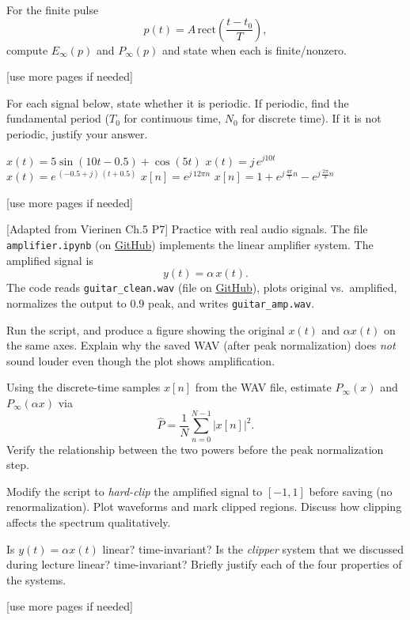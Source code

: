 \documentclass{ee102_pset}
\begin{document}
\problempart{[5 points]}  For the finite pulse
  \[
  p(t)=A\,\mathrm{rect}\!\left(\frac{t-t_0}{T}\right),
  \]
  compute $E_\infty(p)$ and $P_\infty(p)$ and state when each is finite/nonzero.

\vspace*{\fill}
\begin{center}
[use more pages if needed]
\end{center}

For each signal below, state whether it is periodic. If periodic, find the fundamental period ($T_0$ for continuous time, $N_0$ for discrete time). If it is not periodic, justify your answer.

\problempart{[5 points]} $x(t)=5\sin(10t-0.5)+\cos(5t)$
\problempart{[5 points]} $x(t)=j\,e^{j10t}$
\problempart{[5 points]} $x(t)=e^{\,(-0.5+j)\,(t+0.5)}$
\problempart{[5 points]} $x[n]=e^{j\,12\pi n}$
\problempart{[5 points]} $x[n]=1+e^{j\,\frac{4\pi}{7}n}-e^{j\,\frac{2\pi}{3}n}$

\vspace*{\fill}
\begin{center}
[use more pages if needed]
\end{center}

 [Adapted from Vierinen Ch.5 P7] Practice with real audio signals. The file \texttt{amplifier.ipynb} (on \href{https://github.com/ee-ucmerced/ee102-signals-systems/tree/main/homework/week2/amplifier.ipynb}{GitHub}) implements the linear amplifier system. The amplified signal is
\[
y(t)=\alpha\,x(t).
\]
The code reads \texttt{guitar\_clean.wav} (file on \href{https://github.com/ee-ucmerced/ee102-signals-systems/tree/main/homework/week2/guitar\_clean.wav}{GitHub}), plots original vs.\ amplified, normalizes the output to $0.9$ peak, and writes \texttt{guitar\_amp.wav}.

\problempart{[5 points]} Run the script, and produce a figure showing the original $x(t)$ and $\alpha x(t)$ on the same axes. Explain why the saved WAV (after peak normalization) does \emph{not} sound louder even though the plot shows amplification.

\problempart{[5 points]} Using the discrete-time samples $x[n]$ from the WAV file, estimate $P_\infty(x)$ and $P_\infty(\alpha x)$ via
  \[
  \widehat{P}=\frac{1}{N}\sum_{n=0}^{N-1}|x[n]|^2.
  \]
  Verify the relationship between the two powers before the peak normalization step.

\problempart{[5 points]} Modify the script to \emph{hard-clip} the amplified signal to $[-1,1]$ before saving (no renormalization). Plot waveforms and mark clipped regions. Discuss how clipping affects the spectrum qualitatively.

\problempart{[5 points]} Is $y(t)=\alpha x(t)$ linear? time-invariant? Is the \emph{clipper} system that we discussed during lecture linear? time-invariant? Briefly justify each of the four properties of the systems.
\vspace*{\fill}
\begin{center}
[use more pages if needed]
\end{center}
\end{document}
